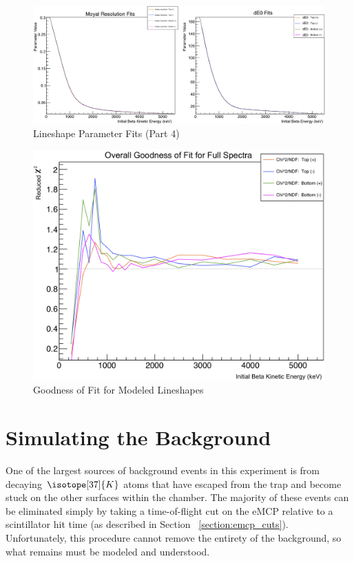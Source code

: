 \begin{figure}[h!!tb]
	\centering
	\includegraphics[width=.999\linewidth]
	{Figures/LineshapeParams_part4.png}
	\caption[Lineshape Parameter Fits (Part 4)]{Lineshape Parameter Fits (Part 4)}	
	\label{fig:lineshapeparams_part4}
\end{figure}
%
\begin{figure}[h!!tb]
	\centering
	\includegraphics[width=.999\linewidth]
	{Figures/Lineshape_Chi2.png}
	\caption[Goodness of Fit for Modeled Lineshapes]{Goodness of Fit for Modeled Lineshapes}	
	\label{fig:lineshape_redchi2}
\end{figure}
%


\clearpage
\section{Simulating the Background}
\label{sec:tof_bg}
One of the largest sources of background events in this experiment is from decaying $\isotope[37]{K}$ atoms that have escaped from the trap and become stuck on the other surfaces within the chamber.  The majority of these events can be eliminated simply by taking a time-of-flight cut on the eMCP relative to a scintillator hit time (as described in Section ~\ref{section:emcp_cuts}).  Unfortunately, this procedure cannot remove the entirety of the background, so what remains must be modeled and understood.  



